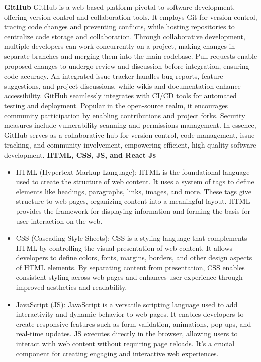 \newline
\newline
\textbf{GitHub}
\newline
GitHub is a web-based platform pivotal to software development, offering version control and collaboration tools. It employs Git for version control, tracing code changes and preventing conflicts, while hosting repositories to centralize code storage and collaboration. Through collaborative development, multiple developers can work concurrently on a project, making changes in separate branches and merging them into the main codebase. Pull requests enable proposed changes to undergo review and discussion before integration, ensuring code accuracy. An integrated issue tracker handles bug reports, feature suggestions, and project discussions, while wikis and documentation enhance accessibility. GitHub seamlessly integrates with CI/CD tools for automated testing and deployment. Popular in the open-source realm, it encourages community participation by enabling contributions and project forks. Security measures include vulnerability scanning and permissions management. In essence, GitHub serves as a collaborative hub for version control, code management, issue tracking, and community involvement, empowering efficient, high-quality software development.
\newline
\newline
\textbf{HTML, CSS, JS, and React Js}
\begin{itemize}
    \item HTML (Hypertext Markup Language): HTML is the foundational language used to create the structure of web content. It uses a system of tags to define elements like headings, paragraphs, links, images, and more. These tags give structure to web pages, organizing content into a meaningful layout. HTML provides the framework for displaying information and forming the basis for user interaction on the web.

    \item CSS (Cascading Style Sheets): CSS is a styling language that complements HTML by controlling the visual presentation of web content. It allows developers to define colors, fonts, margins, borders, and other design aspects of HTML elements. By separating content from presentation, CSS enables consistent styling across web pages and enhances user experience through improved aesthetics and readability.

    \item JavaScript (JS): JavaScript is a versatile scripting language used to add interactivity and dynamic behavior to web pages. It enables developers to create responsive features such as form validation, animations, pop-ups, and real-time updates. JS executes directly in the browser, allowing users to interact with web content without requiring page reloads. It's a crucial component for creating engaging and interactive web experiences.

\end{itemize}
